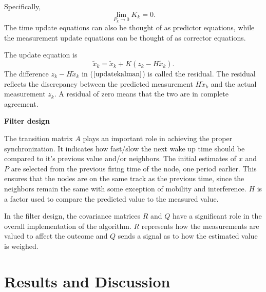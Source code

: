 \documentclass[journal]{IEEEtran}
\begin{document}
Specifically,
\begin{equation}
\mathop {\lim }\limits_{P_k \to 0 } {K_k} = 0.
\end{equation}
The time update equations can also be thought of as predictor
equations, while the measurement update equations can be thought of
as corrector equations.
\par 
The update equation is
\begin{equation}
\tilde x_k = \tilde x_k + K(z_k-H\tilde x_k).
\label{updatekalman}
\end{equation}
The difference $z_k - H\tilde x_k$ in ($\ref{updatekalman}$) is called
the residual. The residual reflects the discrepancy between the
predicted measurement $H\tilde x_k$ and the actual measurement
$z_k$. A residual of zero means that the two are in complete
agreement. \par \noindent
\textbf{Filter design} \par
The transition matrix $A$ plays an important role in achieving
the proper synchronization. It indicates how fast/slow the next wake up time should be compared
to it's previous value and/or neighbors. The initial estimates of $x$ and $P$ are selected from the
previous firing time of the node, one period earlier. This ensures that the nodes are on the same track as the previous time, since the neighbors remain the same with some exception of mobility and interference. $H$ is a factor used to compare the predicted value to the measured value. \par
In the filter design, the covariance matrices $R$ and $Q$ have a significant
role in the overall implementation of the algorithm. $R$ represents how
 the measurements are valued to affect the outcome and $Q$
sends a signal as to how the estimated value is weighed.
\section{\textbf{Results and Discussion}}
\end{document}
